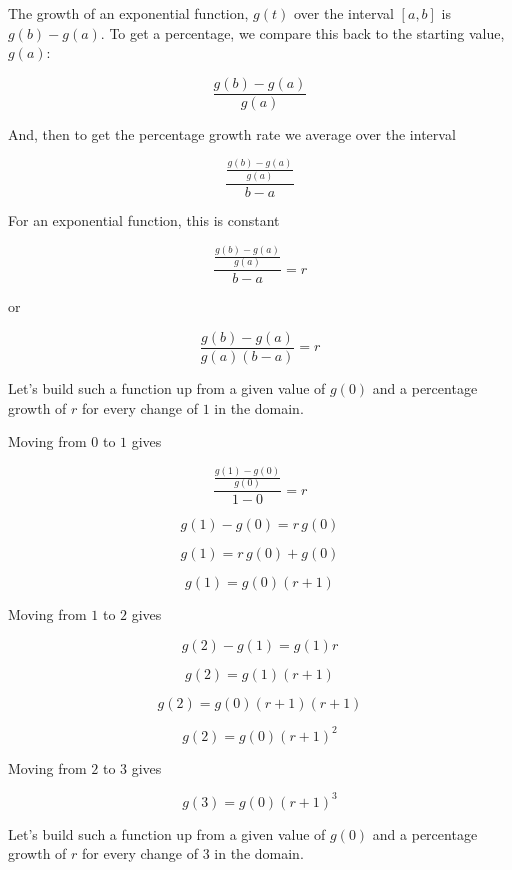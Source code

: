 \documentclass{ximera}
\begin{document}
The growth of an exponential function, $g(t)$ over the interval $[a, b]$ is $g(b)-g(a)$. To get a percentage, we compare this back to the starting value, $g(a)$: 

\[      \frac{g(b)-g(a)}{g(a)}    \]

And, then to get the percentage growth rate we average over the interval



\[      \frac{\frac{g(b)-g(a)}{g(a)}}{b-a}    \]



For an exponential function, this is constant


\[      \frac{\frac{g(b)-g(a)}{g(a)}}{b-a}  = r  \]

or

\[      \frac{g(b)-g(a)}{g(a)(b-a)}  = r  \]



Let's build such a function up from a given value of $g(0)$ and a percentage growth of $r$ for every change of $1$ in the domain. 


\begin{procedure}
Moving from $0$ to $1$ gives

\[      \frac{\frac{g(1)-g(0)}{g(0)}}{1-0}  = r  \]


\[      g(1)-g(0) = r \, g(0)  \]


\[      g(1) = r \, g(0) + g(0)  \]

\[      g(1) =  g(0) (r + 1)  \]



Moving from $1$ to $2$ gives

\[      g(2) - g(1) =  g(1) r  \]

\[      g(2) =  g(1) (r + 1)  \]

\[      g(2) =  g(0) (r + 1) (r + 1)  \]

\[      g(2) =  g(0) (r + 1)^2  \]




Moving from $2$ to $3$ gives

\[      g(3) =  g(0) (r + 1)^3  \]

\end{procedure}



Let's build such a function up from a given value of $g(0)$ and a percentage growth of $r$ for every change of $3$ in the domain. 
\end{document}
